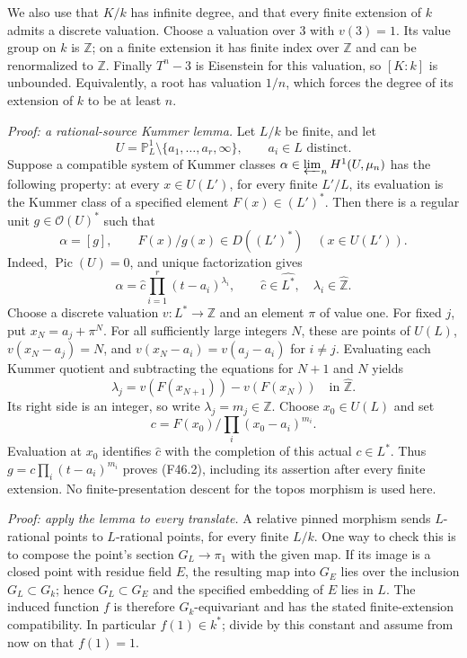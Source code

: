 We also use that $K/k$ has infinite degree, and that every finite
extension of $k$ admits a discrete valuation. Choose a valuation over
$3$ with $v(3)=1$. Its value group on $k$ is $\mathbb Z$; on a finite
extension it has finite index over $\mathbb Z$ and can be renormalized
to $\mathbb Z$. Finally $T^n-3$ is Eisenstein for this valuation, so
$[K:k]$ is unbounded. Equivalently, a root has valuation $1/n$, which
forces the degree of its extension of $k$ to be at least $n$.

\emph{Proof: a rational-source Kummer lemma.}
Let $L/k$ be finite, and let
\[
 U=\mathbb P^1_L\setminus\{a_1,\ldots,a_r,\infty\},
 \qquad a_i\in L\text{ distinct}.
\]
Suppose a compatible system of Kummer classes
$\alpha\in\varprojlim_n H^1(U,\mu_n)$ has the following property:
at every $x\in U(L')$, for every finite $L'/L$, its evaluation is the
Kummer class of a specified element $F(x)\in(L')^*$.
Then there is a regular unit $g\in\mathcal O(U)^*$ such that
\[
 \alpha=[g],\qquad F(x)/g(x)\in D((L')^*)
       \quad(x\in U(L')).                                  \tag{F46.2}
\]
Indeed, $\operatorname{Pic}(U)=0$, and unique factorization gives
\[
 \alpha=\widehat c\prod_{i=1}^r(t-a_i)^{\lambda_i},\qquad
 \widehat c\in\widehat{L^*},\quad\lambda_i\in\widehat{\mathbb Z}.
\]
Choose a discrete valuation $v:L^*\to\mathbb Z$ and an element
$\pi$ of value one. For fixed $j$, put $x_N=a_j+\pi^N$.
For all sufficiently large integers $N$, these are points of $U(L)$,
$v(x_N-a_j)=N$, and
$v(x_N-a_i)=v(a_j-a_i)$ for $i\ne j$.
Evaluating each Kummer quotient and subtracting the equations for
$N+1$ and $N$ yields
\[
 \lambda_j=v(F(x_{N+1}))-v(F(x_N))
       \quad\text{in }\widehat{\mathbb Z}.
\]
Its right side is an integer, so write $\lambda_j=m_j\in\mathbb Z$.
Choose $x_0\in U(L)$ and set
\[
 c=F(x_0)\Big/\prod_i(x_0-a_i)^{m_i}.
\]
Evaluation at $x_0$ identifies $\widehat c$ with the completion of
this actual $c\in L^*$. Thus $g=c\prod_i(t-a_i)^{m_i}$ proves
(F46.2), including its assertion after every finite extension.
No finite-presentation descent for the topos morphism is used here.

\emph{Proof: apply the lemma to every translate.}
A relative pinned morphism sends $L$-rational points to
$L$-rational points, for every finite $L/k$. One way to check this
is to compose the point's section $G_L\to\pi_1$ with the given map.
If its image is a closed point with residue field $E$, the resulting
map into $G_E$ lies over the inclusion $G_L\subset G_k$; hence
$G_L\subset G_E$ and the specified embedding of $E$ lies in $L$.
The induced function $f$ is therefore $G_k$-equivariant and has the
stated finite-extension compatibility. In particular $f(1)\in k^*$;
divide by this constant and assume from now on that $f(1)=1$.

